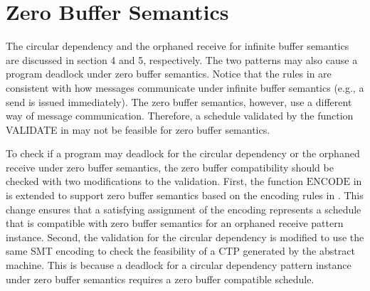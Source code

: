 \section{Zero Buffer Semantics}
The circular dependency and the orphaned receive for infinite buffer semantics are discussed in section 4 and 5, respectively. The two patterns may also cause a program deadlock under zero buffer semantics. Notice that the rules in  are consistent with how messages communicate under infinite buffer semantics (e.g., a send is issued immediately). 
The zero buffer semantics, however, use a different way of message communication. 
Therefore, a schedule validated by the function \textrm{VALIDATE} in  may not be feasible for zero buffer semantics. 

To check if a program may deadlock for the circular dependency or the orphaned receive under zero buffer semantics, the zero buffer compatibility \cite{HuangNFM15} should be checked with two modifications to the validation. 
First, the function $\mathrm{ENCODE}$ in  is extended to support zero buffer semantics based on the encoding rules in \cite{HuangNFM15}. This change ensures that a satisfying assignment of the encoding represents a schedule that is compatible with zero buffer semantics for an orphaned receive pattern instance.
Second, the validation for the circular dependency is modified to use the same SMT encoding to check the feasibility of a CTP generated by the abstract machine. This is because a deadlock for a circular dependency pattern instance under zero buffer semantics requires a zero buffer compatible schedule.
